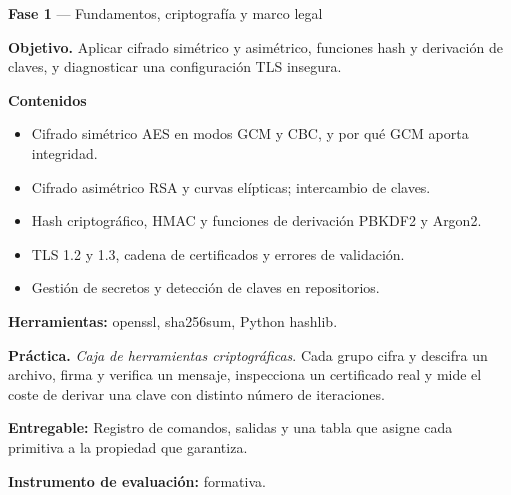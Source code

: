 \documentclass[11pt,a4paper]{article}
\begin{document}
\begin{tcolorbox}[cajaContenido,title={Semana 2 --- Criptografía aplicada y gestión de secretos}]
\textbf{Fase 1} --- Fundamentos, criptografía y marco legal

\textbf{Objetivo.} Aplicar cifrado simétrico y asimétrico, funciones hash y derivación de claves, y diagnosticar una configuración TLS insegura.

\textbf{Contenidos}

\begin{itemize}[leftmargin=1.4em,itemsep=2pt,topsep=3pt]
  \item Cifrado simétrico AES en modos GCM y CBC, y por qué GCM aporta integridad.
  \item Cifrado asimétrico RSA y curvas elípticas; intercambio de claves.
  \item Hash criptográfico, HMAC y funciones de derivación PBKDF2 y Argon2.
  \item TLS 1.2 y 1.3, cadena de certificados y errores de validación.
  \item Gestión de secretos y detección de claves en repositorios.
\end{itemize}

\textbf{Herramientas:} openssl, sha256sum, Python hashlib.

\textbf{Práctica.} \emph{Caja de herramientas criptográficas}. Cada grupo cifra y descifra un archivo, firma y verifica un mensaje, inspecciona un certificado real y mide el coste de derivar una clave con distinto número de iteraciones.


\textbf{Entregable:} Registro de comandos, salidas y una tabla que asigne cada primitiva a la propiedad que garantiza.

\textbf{Instrumento de evaluación:} formativa.
\end{tcolorbox}
\end{document}
